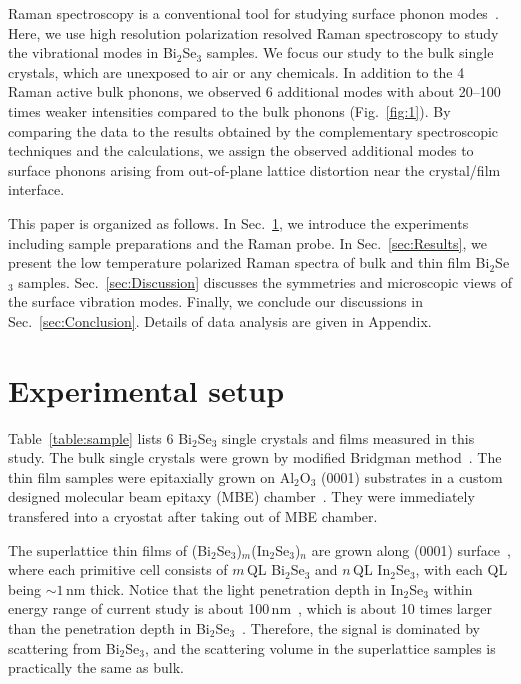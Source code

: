 \documentclass[reprint,aps,pra,superscriptaddress,amsmath,amssymb,linenumbers,longbibliography]{revtex4-1}
\begin{document}
Raman spectroscopy is a conventional tool for studying surface phonon modes~\cite{Esser1999,Liebhaber2014}.
Here, we use high resolution polarization resolved Raman spectroscopy to study the vibrational modes in Bi$_2$Se$_3$ samples.
We focus our study to the bulk single crystals, which are unexposed to air or any chemicals.
In addition to the 4 Raman active bulk phonons, we observed 6 additional modes with about 20--100 times weaker intensities compared to the bulk phonons (Fig.~\ref{fig:1}).
By comparing the data to the results obtained by the complementary spectroscopic techniques and the calculations, we assign the observed additional modes to surface phonons arising from out-of-plane lattice distortion near the crystal/film interface.

This paper is organized as follows. 
In Sec.~\ref{sec:Exp}, we introduce the experiments including sample preparations and the Raman probe.
In Sec.~\ref{sec:Results}, we present the low temperature polarized Raman spectra of bulk and thin film Bi$_2$Se$_3$ samples.
Sec.~\ref{sec:Discussion} discusses the symmetries and microscopic views of the surface vibration modes.
Finally, we conclude our discussions in Sec.~\ref{sec:Conclusion}.
Details of data analysis are given in Appendix.
%
\section{Experimental setup}\label{sec:Exp}
Table~\ref{table:sample} lists 6 Bi$_2$Se$_3$ single crystals and films measured in this study.
The bulk single crystals were grown by modified Bridgman method~\cite{Lostak1990,Dai2016}.
The thin film samples were epitaxially grown on Al$_2$O$_3$ (0001) substrates in a custom designed molecular beam epitaxy (MBE) chamber~\cite{Brahlek2012,Bansal2012}.
They were immediately transfered into a cryostat after taking out of MBE chamber.

The superlattice thin films of (Bi$_2$Se$_3$)$_m$(In$_2$Se$_3$)$_n$ are grown along (0001) surface~\cite{Brahlek2012}, where each primitive cell consists of $m$\,QL Bi$_2$Se$_3$ and $n$\,QL In$_2$Se$_3$, with each QL being $\sim 1$\,nm thick.
Notice that the light penetration depth in In$_2$Se$_3$ within energy range of current study is about 100\,nm~\cite{Emziane2000}, which is about 10 times larger than the penetration depth in Bi$_2$Se$_3$~\cite{McIver2012}.
Therefore, the signal is dominated by scattering from Bi$_2$Se$_3$, and the scattering volume in the superlattice samples is practically the same as bulk.
\end{document}

